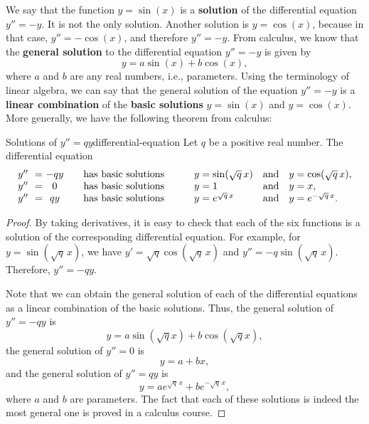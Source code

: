 We say that the function $y=\sin(x)$ is a \textbf{solution}%
 of the differential equation
$y'' = -y$. It is not the only solution. Another solution is
$y=\cos(x)$, because in that case, $y''=-\cos(x)$, and therefore
$y''=-y$. From calculus, we know that the \textbf{general solution} to
the differential equation $y'' = -y$ is given by
\begin{equation*}
  y = a\sin(x) + b\cos(x),
\end{equation*}
where $a$ and $b$ are any real numbers, i.e., parameters. Using the
terminology of linear algebra, we can say that the general solution of
the equation $y'' = -y$ is a \textbf{linear combination}%
of the \textbf{basic solutions}%
%
 $y=\sin(x)$ and
$y=\cos(x)$. More generally, we have the following theorem from
calculus:

\begin{theorem}{Solutions of $y''=qy$}{differential-equation}
  Let $q$ be a positive real number.  The differential equation
  \begin{equation*}
    \begin{array}{l@{~~}l@{~}clllll}
    y'' &=& -qy &\quad\mbox{has basic solutions}\quad\quad &
    y = \sin(\sqrt{q}\,x) & \mbox{and} & y = \cos(\sqrt{q}\,x), \\
    y'' &=& 0 &\quad\mbox{has basic solutions}\quad\quad &
    y = 1 & \mbox{and} & y = x, \\
    y'' &=& qy &\quad\mbox{has basic solutions}\quad\quad &
    y = e^{\sqrt{q}\,x} & \mbox{and} & y = e^{-\sqrt{q}\,x}. \\
    \end{array}
  \end{equation*}
\end{theorem}

\begin{proof}
  By taking derivatives, it is easy to check that each of the six
  functions is a solution of the corresponding differential
  equation. For example, for $y=\sin(\sqrt{q}\,x)$, we have
  $y'=\sqrt{q}\cos(\sqrt{q}\,x)$ and
  $y''=-q\sin(\sqrt{q}\,x)$. Therefore, $y''=-qy$.

  Note that we can obtain the general solution of each of the
  differential equations as a linear combination of the basic
  solutions. Thus, the general solution of $y''=-qy$ is
  \begin{equation*}
      y = a\sin(\sqrt{q}x) + b\cos(\sqrt{q}x),
  \end{equation*}
  the general solution of $y''=0$ is
  \begin{equation*}
      y = a + bx,
  \end{equation*}
  and the general solution of $y''=qy$ is
  \begin{equation*}
      y = ae^{\sqrt{q}\,x} + be^{-\sqrt{q}\,x},
  \end{equation*}
  where $a$ and $b$ are parameters. The fact that each of these
  solutions is indeed the most general one is proved in a calculus
  course.
\end{proof}

